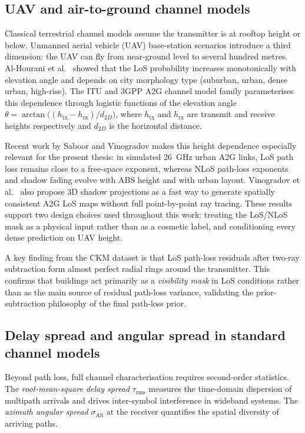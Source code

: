 \subsection{UAV and air-to-ground channel models}

Classical terrestrial channel models assume the transmitter is at rooftop height
or below.  Unmanned aerial vehicle (UAV) base-station scenarios introduce a
third dimension: the UAV can fly from near-ground level to several hundred
metres.  Al-Hourani et al.~\cite{alhourani2014} showed that the LoS probability
increases monotonically with elevation angle and depends on city morphology type
(suburban, urban, dense urban, high-rise).  The ITU and 3GPP A2G channel model
family \cite{tr38901,khawaja_survey} parameterises this dependence through
logistic functions of the elevation angle
$\theta = \arctan\!\bigl((h_{\mathrm{tx}} - h_{\mathrm{rx}})/d_{2D}\bigr)$,
where $h_{\mathrm{tx}}$ and $h_{\mathrm{rx}}$ are transmit and receive heights
respectively and $d_{2D}$ is the horizontal distance.

Recent work by Saboor and Vinogradov \cite{saboor2025height} makes this
height dependence especially relevant for the present thesis: in simulated
26~GHz urban A2G links, LoS path loss remains close to a free-space exponent,
whereas NLoS path-loss exponents and shadow fading evolve with ABS height and
with urban layout. Vinogradov et al.\ \cite{vinogradov2026shadow} also propose
3D shadow projections as a fast way to generate spatially consistent A2G LoS
maps without full point-by-point ray tracing. These results support two design
choices used throughout this work: treating the LoS/NLoS mask as a physical
input rather than as a cosmetic label, and conditioning every dense prediction
on UAV height.

A key finding from the CKM dataset is that LoS path-loss residuals after
two-ray subtraction form almost perfect radial rings around the transmitter.
This confirms that buildings act primarily as a \emph{visibility mask} in LoS
conditions rather than as the main source of residual path-loss variance,
validating the prior-subtraction philosophy of the final path-loss prior.

\subsection{Delay spread and angular spread in standard channel models}

Beyond path loss, full channel characterisation requires second-order statistics.
The \emph{root-mean-square delay spread} $\tau_{\mathrm{rms}}$ measures the
time-domain dispersion of multipath arrivals and drives inter-symbol interference
in wideband systems.  The \emph{azimuth angular spread} $\sigma_{\mathrm{AS}}$
at the receiver quantifies the spatial diversity of arriving paths.

